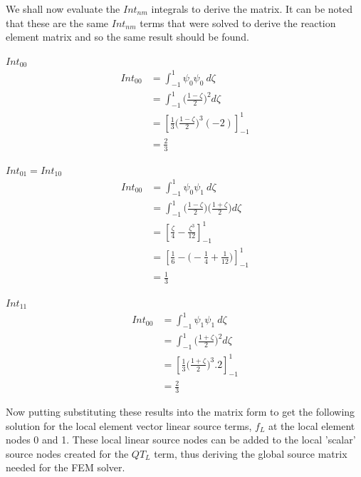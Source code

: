 \documentclass[11pt]{article}
\begin{document}
We shall now evaluate the $Int_{nm}$ integrals to derive the matrix. It can be noted that these are the same $Int_{nm}$ terms that were solved to derive the reaction element matrix and so the same result should be found.

\underline{$Int_{00}$} \\
\begin{equation}\label{eq:LSInt00}
\begin{split}
 Int_{00} &= \int_{-1}^{1} \psi_{0}\psi_{0} \ d \zeta \\
&=  \int_{-1}^{1}  \Big ( \frac{1-\zeta}{2} \Big )^2 d\zeta \\
& = \left[ \frac{1}{3} \Big ( \frac{1-\zeta}{2} \Big )^3 (-2) \right]_{-1}^{1} \\
& = \frac{2}{3}
\end{split}
\end{equation}

\underline{$Int_{01} = Int_{10}$} \\

\begin{equation}\label{eq:LSInt01}
\begin{split}
 Int_{00} &= \int_{-1}^{1} \psi_{0}\psi_{1} \ d \zeta \\
&=  \int_{-1}^{1}  \Big ( \frac{1-\zeta}{2} \Big )  \Big ( \frac{1+\zeta}{2} \Big )d\zeta \\
& = \left[ \frac{\zeta}{4} - \frac{\zeta^3}{12}\right]_{-1}^{1} \\
& = \left[ \frac{1}{6} -  \Big (-\frac{1}{4} + \frac{1}{12} \Big )\right]_{-1}^{1} \\
& = \frac{1}{3}
\end{split}
\end{equation}

\underline{$Int_{11}$} \\
\begin{equation}\label{eq:LSInt00}
\begin{split}
 Int_{00} &= \int_{-1}^{1} \psi_{1}\psi_{1} \ d \zeta \\
&=  \int_{-1}^{1}  \Big ( \frac{1+\zeta}{2} \Big )^2 d\zeta \\
& = \left[ \frac{1}{3} \Big ( \frac{1+\zeta}{2}\Big)^3 . 2 \right]_{-1}^{1} \\
& = \frac{2}{3}
\end{split}
\end{equation}



Now putting substituting these results into the matrix form to get the following solution for the local element vector linear source terms, $f_L$ at the local element nodes 0 and 1. These local linear source nodes can be added to the local 'scalar' source nodes created for the $QT_L$ term, thus deriving the global source matrix needed for the FEM solver.
\end{document}

